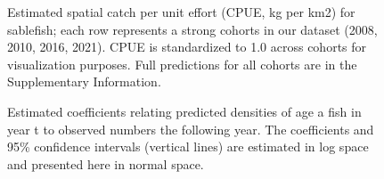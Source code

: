 \documentclass[
]{article}
\begin{document}
\begin{figure}


\caption{\label{fig-sablefish-spatial-composition}Estimated spatial
catch per unit effort (CPUE, kg per km2) for sablefish; each row
represents a strong cohorts in our dataset (2008, 2010, 2016, 2021).
CPUE is standardized to 1.0 across cohorts for visualization purposes.
Full predictions for all cohorts are in the Supplementary Information.}

\end{figure}%

\newpage

\begin{figure}


\caption{\label{fig-glm-coefficients}Estimated coefficients relating
predicted densities of age a fish in year t to observed numbers the
following year. The coefficients and 95\% confidence intervals (vertical
lines) are estimated in log space and presented here in normal space.}

\end{figure}%
\end{document}
